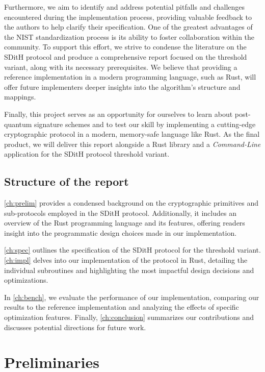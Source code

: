 \documentclass[11pt]{report}
\theoremstyle{definition}
\theoremstyle{plain}
\begin{document}
Furthermore, we aim to identify and address potential pitfalls and challenges encountered during the implementation process, providing valuable feedback to the authors to help clarify their specification. One of the greatest advantages of the NIST standardization process is its ability to foster collaboration within the community. To support this effort, we strive to condense the literature on the SDitH protocol and produce a comprehensive report focused on the threshold variant, along with its necessary prerequisites. We believe that providing a reference implementation in a modern programming language, such as Rust, will offer future implementers deeper insights into the algorithm's structure and mappings.

Finally, this project serves as an opportunity for ourselves to learn about post-quantum signature schemes and to test our skill by implementing a cutting-edge cryptographic protocol in a modern, memory-safe language like Rust. As the final product, we will deliver this report alongside a Rust library and a \textit{Command-Line} application for the SDitH protocol threshold variant.

\section{Structure of the report}
\autoref{ch:prelim} provides a condensed background on the cryptographic primitives and sub-protocols employed in the SDitH protocol. Additionally, it includes an overview of the Rust programming language and its features, offering readers insight into the programmatic design choices made in our implementation.

\autoref{ch:spec} outlines the specification of the SDitH protocol for the threshold variant. \autoref{ch:impl} delves into our implementation of the protocol in Rust, detailing the individual subroutines and highlighting the most impactful design decisions and optimizations.

In \autoref{ch:bench}, we evaluate the performance of our implementation, comparing our results to the reference implementation and analyzing the effects of specific optimization features. Finally, \autoref{ch:conclusion} summarizes our contributions and discusses potential directions for future work.


\chapter{Preliminaries}\label{ch:prelim}
\end{document}
